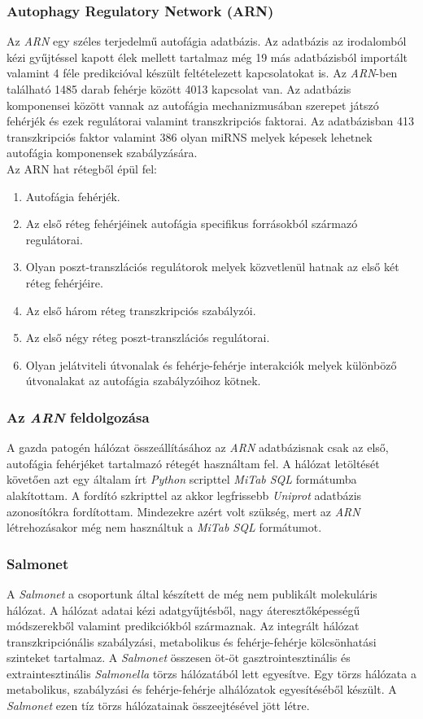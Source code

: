 \documentclass[a4paper,12pt]{article}
\begin{document}
			\subsubsection{Autophagy Regulatory Network (ARN)}
			Az \textit{ARN} egy széles terjedelmű autofágia adatbázis. Az adatbázis az irodalomból kézi gyűjtéssel kapott élek mellett tartalmaz még 19 más adatbázisból importált valamint 4 féle predikcióval készült feltételezett kapcsolatokat is. Az \textit{ARN}-ben található 1485 darab fehérje között 4013 kapcsolat van. Az adatbázis komponensei között vannak az autofágia mechanizmusában szerepet játszó fehérjék és ezek regulátorai valamint transzkripciós faktorai. Az adatbázisban 413 transzkripciós faktor valamint 386 olyan miRNS melyek képesek lehetnek autofágia komponensek szabályzására.\cite{ARN} \\
			Az ARN hat rétegből épül fel:
			\begin{enumerate}
				\item Autofágia fehérjék.
				\item Az első réteg fehérjéinek autofágia specifikus forrásokból származó regulátorai.
				\item Olyan poszt-transzlációs regulátorok melyek közvetlenül hatnak az első két réteg fehérjéire.
				\item Az első három réteg transzkripciós szabályzói.
				\item Az első négy réteg poszt-transzlációs regulátorai.
				\item Olyan jelátviteli útvonalak és fehérje-fehérje interakciók melyek különböző útvonalakat az autofágia szabályzóihoz kötnek.
			\end{enumerate} \cite{ARN}
			
			\subsubsection{Az \textit{ARN} feldolgozása}
			A gazda patogén hálózat összeállításához az \textit{ARN} adatbázisnak csak az első, autofágia fehérjéket tartalmazó rétegét használtam fel. A hálózat letöltését követően azt egy általam írt \textit{Python} scripttel \textit{MiTab SQL} formátumba alakítottam. A fordító szkripttel az akkor legfrissebb \textit{Uniprot} adatbázis azonosítókra fordítottam. Mindezekre azért volt szükség, mert az \textit{ARN} létrehozásakor még nem használtuk a \textit{MiTab SQL} formátumot.
		
			\subsubsection{Salmonet} 
			A \textit{Salmonet} a csoportunk által készített de még nem publikált molekuláris hálózat. A hálózat adatai kézi adatgyűjtésből, nagy áteresztőképességű módszerekből valamint predikciókból származnak. Az  integrált hálózat transzkripciónális szabályzási, metabolikus és fehérje-fehérje kölcsönhatási szinteket tartalmaz. A \textit{Salmonet} összesen öt-öt gasztrointesztinális és extraintesztinális \textit{Salmonella} törzs hálózatából lett egyesítve. Egy törzs hálózata a metabolikus, szabályzási és fehérje-fehérje alhálózatok egyesítéséből készült. A \textit{Salmonet} ezen tíz törzs hálózatainak összeejtésével jött létre.
			\cite{salmonet}
			
\end{document}
